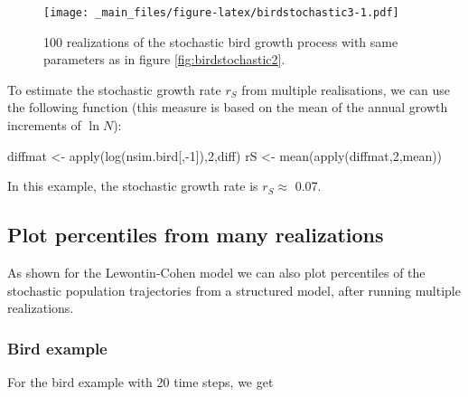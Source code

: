 \documentclass[
]{book}
\newenvironment{Shaded}{\begin{snugshade}}{\end{snugshade}}
\newcommand{\DecValTok}[1]{\textcolor[rgb]{0.00,0.00,0.81}{#1}}
\newcommand{\FunctionTok}[1]{\textcolor[rgb]{0.00,0.00,0.00}{#1}}
\newcommand{\NormalTok}[1]{#1}
\newcommand{\OtherTok}[1]{\textcolor[rgb]{0.56,0.35,0.01}{#1}}
\newcommand{\SpecialCharTok}[1]{\textcolor[rgb]{0.00,0.00,0.00}{#1}}
\begin{document}
\begin{figure}
\centering
\texttt{[image: \_main\_files/figure-latex/birdstochastic3-1.pdf]}
\caption{\label{fig:birdstochastic3}100 realizations of the stochastic bird growth process with same parameters as in figure \ref{fig:birdstochastic2}.}
\end{figure}

To estimate the stochastic growth rate \(r_S\) from multiple realisations, we can use the following function (this measure is based on the mean of the annual growth increments of \(\ln N\)):

\begin{Shaded}
\begin{Highlighting}[]
\NormalTok{diffmat }\OtherTok{\textless{}{-}} \FunctionTok{apply}\NormalTok{(}\FunctionTok{log}\NormalTok{(nsim.bird[,}\SpecialCharTok{{-}}\DecValTok{1}\NormalTok{]),}\DecValTok{2}\NormalTok{,diff)}
\NormalTok{rS }\OtherTok{\textless{}{-}} \FunctionTok{mean}\NormalTok{(}\FunctionTok{apply}\NormalTok{(diffmat,}\DecValTok{2}\NormalTok{,mean))}
\end{Highlighting}
\end{Shaded}

In this example, the stochastic growth rate is \(r_S\approx\) 0.07.

\hypertarget{plot-percentiles-from-many-realizations-1}{%
\subsection*{Plot percentiles from many realizations}\label{plot-percentiles-from-many-realizations-1}}

As shown for the Lewontin-Cohen model we can also plot percentiles of the stochastic population trajectories from a structured model, after running multiple realizations.

\hypertarget{bird-example-19}{%
\subsubsection*{Bird example}\label{bird-example-19}}

For the bird example with 20 time steps, we get
\end{document}
